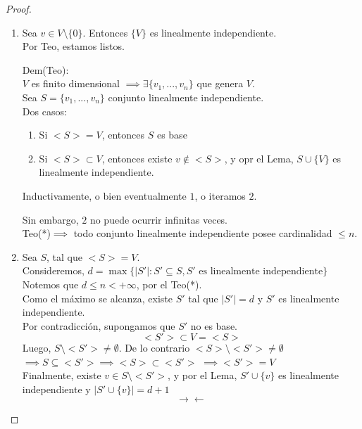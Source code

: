 \documentclass[11pt]{book}
\theoremstyle{definition}
\begin{document}
\begin{proof}
	\begin{enumerate}[label=\alph*)]
		\item Sea $v\in V\setminus\{0\}$. Entonces $\{V\}$ es linealmente independiente.\\
		      Por Teo, estamos listos.

		      Dem(Teo):\\
		      $V$ es finito dimensional $\implies\exists\{v_1,...,v_n\}$ que genera $V$.\\
		      Sea $S=\{v_1,...,v_n\}$ conjunto linealmente independiente.\\
		      Dos casos:
		      \begin{enumerate}
			      \item Si $<S>=V$, entonces $S$ es base

			      \item Si $<S>\subset V$, entonces existe $v\notin<S>$, y opr el Lema, $S\cup\{V\}$ es linealmente independiente.
		      \end{enumerate}
		      Inductivamente, o bien eventualmente $1$, o iteramos $2$.

		      Sin embargo, $2$ no puede ocurrir infinitas veces.\\
		      Teo(*)$\implies$ todo conjunto linealmente independiente posee cardinalidad $\leq n$.

		\item Sea $S$, tal que $<S>=V$.\\
		      Consideremos, $d=\max\{|S'|:S'\subseteq S, S'\textrm{ es linealmente independiente}\}$\\
		      Notemos que $d\leq n<+\infty$, por el Teo(*).\\
		      Como el máximo se alcanza, existe $S'$ tal que $|S'|=d$ y $S'$ es linealmente independiente.\\
		      Por contradicción, supongamos que $S'$ no es base.
		      \[
			      <S'>\subset V=<S>
		      \]
		      Luego, $S\setminus<S'>\neq\emptyset$. De lo contrario $<S>\setminus<S'>\neq\emptyset$\\
		      $\implies S\subseteq <S'>\implies <S>\subset<S'>$
		      $\implies <S'>=V$\\
		      Finalmente, existe $v\in S\setminus<S'>$, y por el Lema, $S'\cup\{v\}$ es linealmente independiente y $|S'\cup\{v\}|=d+1$
		      \[
			      \rightarrow\leftarrow
		      \]
	\end{enumerate}
\end{proof}
\end{document}
